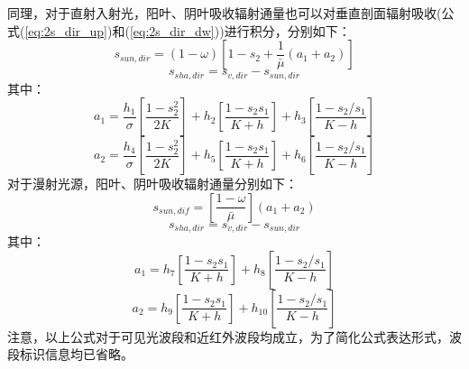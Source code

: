 同理，对于直射入射光，阳叶、阴叶吸收辐射通量也可以对垂直剖面辐射吸收(公式(\ref{eq:2s_dir_up})和(\ref{eq:2s_dir_dw}))进行积分，分别如下：
\begin{equation}
s_{sun, dir}=(1-\omega)\left[1-s_{2}+\frac{1}{\bar{\mu}}\left(a_{1}+a_{2}\right)\right]
\end{equation}
\begin{equation}
s_{sha, dir}=s_{v, dir}-s_{sun, dir}
\end{equation}
其中：
\begin{equation}
a_{1}=\frac{h_{1}}{\sigma}\left[\frac{1-s_{2}^{2}}{2 K}\right]+h_{2}\left[\frac{1-s_{2} s_{1}}{K+h}\right]+h_{3}\left[\frac{1-s_{2} / s_{1}}{K-h}\right]
\end{equation}
%
\begin{equation}
a_{2}=\frac{h_{4}}{\sigma}\left[\frac{1-s_{2}^{2}}{2 K}\right]+h_{5}\left[\frac{1-s_{2} s_{1}}{K+h}\right]+h_{6}\left[\frac{1-s_{2} / s_{1}}{K-h}\right]
\end{equation}
对于漫射光源，阳叶、阴叶吸收辐射通量分别如下：
\begin{equation}
s_{sun,dif}=\left[\frac{1-\omega}{\bar{\mu}}\right]\left(a_{1}+a_{2}\right)
\end{equation}
\begin{equation}
s_{sha, dir}=s_{v, dir}-s_{sun, dir}
\end{equation}
其中：
\begin{equation}
a_{1}=h_{7}\left[\frac{1-s_{2} s_{1}}{K+h}\right]+h_{8}\left[\frac{1-s_{2} / s_{1}}{K-h}\right]
\end{equation}
%
\begin{equation}
a_{2}=h_{9}\left[\frac{1-s_{2} s_{1}}{K+h}\right]+h_{10}\left[\frac{1-s_{2} / s_{1}}{K-h}\right]
\end{equation}
注意，以上公式对于可见光波段和近红外波段均成立，为了简化公式表达形式，波段标识信息均已省略。


